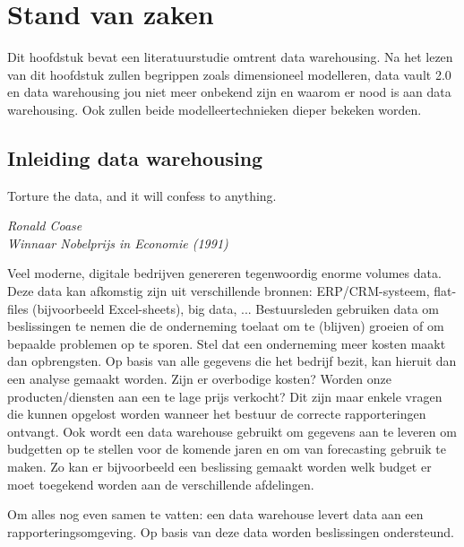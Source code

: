 \chapter{Stand van zaken}
\label{ch:stand-van-zaken}



Dit hoofdstuk bevat een literatuurstudie omtrent data warehousing. Na het lezen van dit hoofdstuk zullen begrippen zoals dimensioneel modelleren, data vault 2.0 en data warehousing jou niet meer onbekend zijn en waarom er nood is aan data warehousing. Ook zullen beide modelleertechnieken dieper bekeken worden.

\section{Inleiding data warehousing}

\epigraph{Torture the data, and it will confess to anything. }{\textit{Ronald Coase \\ Winnaar Nobelprijs in Economie (1991)}}

Veel moderne, digitale bedrijven genereren tegenwoordig enorme volumes data. Deze data kan afkomstig zijn uit verschillende bronnen: ERP/CRM-systeem, flat-files (bijvoorbeeld Excel-sheets), big data, ... Bestuursleden gebruiken data om beslissingen te nemen die de onderneming toelaat om te (blijven) groeien of om bepaalde problemen op te sporen. Stel dat een onderneming meer kosten maakt dan opbrengsten. Op basis van alle gegevens die het bedrijf bezit, kan hieruit dan een analyse gemaakt worden. Zijn er overbodige kosten? Worden onze producten/diensten aan een te lage prijs verkocht? Dit zijn maar enkele vragen die kunnen opgelost worden wanneer het bestuur de correcte rapporteringen ontvangt. Ook wordt een data warehouse gebruikt om gegevens aan te leveren om budgetten op te stellen voor de komende jaren en om van forecasting gebruik te maken. Zo kan er bijvoorbeeld een beslissing gemaakt worden welk budget er moet toegekend worden aan de verschillende afdelingen. 

Om alles nog even samen te vatten: een data warehouse levert data aan een rapporteringsomgeving. Op basis van deze data worden beslissingen ondersteund.

